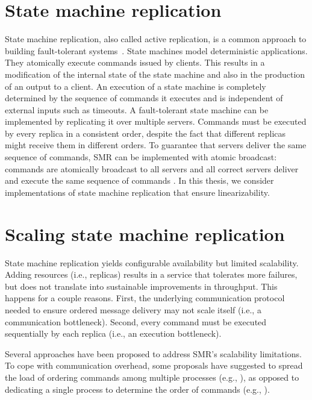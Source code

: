 \section{State machine replication}
\label{sec:smr}
State machine replication, also called active replication, is a common approach
to building fault-tolerant systems~\cite{Lam78, Sch90}. State machines model
deterministic applications. They atomically execute commands issued by clients.
This results in a modification of the internal state of the state machine and
also in the production of an output to a client. An execution of a state machine
is completely determined by the sequence of commands it executes and is
independent of external inputs such as timeouts. A fault-tolerant state machine
can be implemented by replicating it over multiple servers. Commands must be
executed by every replica in a consistent order, despite the fact that different
replicas might receive them in different orders. To guarantee that servers
deliver the same sequence of commands, SMR can be implemented with atomic
broadcast: commands are atomically broadcast to all servers and all correct
servers deliver and execute the same sequence of commands \cite{BJ87b,DSU04}. In
this thesis, we consider implementations of state machine replication that
ensure linearizability.

\section{Scaling state machine replication}

State machine replication yields configurable availability but limited
scalability. Adding resources (i.e., replicas) results in a service that
tolerates more failures, but does not translate into sustainable improvements in
throughput. This happens for a couple reasons. First, the underlying
communication protocol needed to ensure ordered message delivery may not scale
itself (i.e., a communication bottleneck). Second, every command must be
executed sequentially by each replica (i.e., an execution bottleneck).

Several approaches have been proposed to address SMR's scalability limitations.
To cope with communication overhead, some proposals have suggested to spread the
load of ordering commands among multiple processes (e.g.,
\cite{Moraru:2013gw,Mencius,Marandi:2012hb}), as opposed to dedicating a single
process to determine the order of commands (e.g.,
\cite{Lam98}).%

